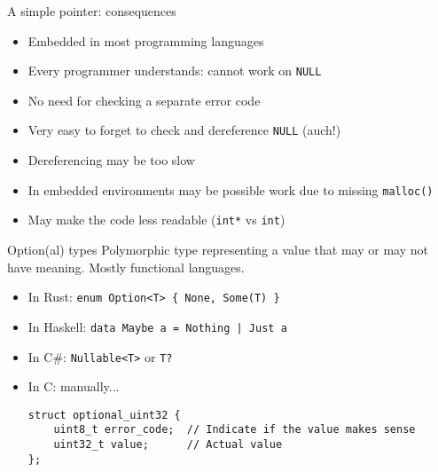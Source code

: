 \documentclass[aspectratio=169,14pt]{beamer}
\begin{document}
\begin{frame}[fragile]{A simple pointer: consequences}
\begin{itemize}
    \item[\good] Embedded in most programming languages
    \item[\good] Every programmer understands: cannot work on \texttt{NULL}
    \item[\good] No need for checking a separate error code
    \item[\bad] Very easy to forget to check and dereference \texttt{NULL} (auch!)
    \item[\bad] Dereferencing may be too slow
    \item[\meh] In embedded environments may be possible work due to missing \texttt{malloc()}
    \item[\meh] May make the code less readable (\texttt{int*} vs \texttt{int})
\end{itemize}
\end{frame}



\begin{frame}[fragile]{Option(al) types}
Polymorphic type representing a value that may or may not have meaning. Mostly functional languages.
\begin{itemize}
    \item In Rust: \texttt{enum Option<T> \{ None, Some(T) \}}
    \item In Haskell: \texttt{data Maybe a = Nothing | Just a}
    \item In C\#: \texttt{Nullable<T>} or \texttt{T?}
    \item In C: manually...
\begin{lstlisting}[style=cstyle]
struct optional_uint32 {
    uint8_t error_code;  // Indicate if the value makes sense
    uint32_t value;      // Actual value
};
\end{lstlisting}
\end{itemize}
\end{frame}
\end{document}
